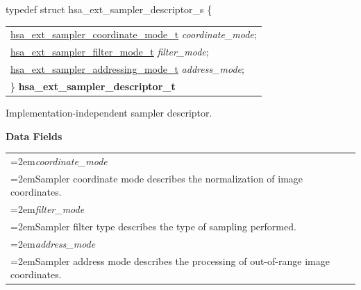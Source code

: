 \documentclass[final]{book}
\newcommand{\reffld}[1]{\textit{#1}}
\begin{document}
\noindent\begin{tcolorbox}[breakable,nobeforeafter,arc=0mm,colframe=white,colback=lightgray,left=0mm]
typedef struct  hsa_ext_sampler_descriptor_s \{
\vspace{-3.5mm}\begin{longtable}{@{}p{\textwidth}}
\hspace{1.7em}\hyperlink{group__images_1gad7644f3eccb4f8ce5693313b88440d87}{hsa_ext_sampler_coordinate_mode_t} \reffld{coordinate_mode};\\
\hspace{1.7em}\hyperlink{group__images_1ga0f0c16fdeea5c2a56130ecefe7cefd02}{hsa_ext_sampler_filter_mode_t} \reffld{filter_mode};\\
\hspace{1.7em}\hyperlink{group__images_1ga60a9fcdc1a1f338bd7e54445359fdf0f}{hsa_ext_sampler_addressing_mode_t} \reffld{address_mode};\\
\}  \hypertarget{group__images_1ga4d5e53a9c2225305ab307cdbfa3cbbd2}{\textbf{hsa_ext_sampler_descriptor_t}}
\end{longtable}

\end{tcolorbox}
Implementation-independent sampler descriptor.

\noindent\textbf{Data Fields}\\[-6mm]
\begin{longtable}{@{}>{\hangindent=2em}p{\textwidth}}
\reffld{coordinate_mode}\\\hspace{2em}Sampler coordinate mode describes the normalization of image coordinates.\\[2mm]
\reffld{filter_mode}\\\hspace{2em}Sampler filter type describes the type of sampling performed.\\[2mm]
\reffld{address_mode}\\\hspace{2em}Sampler address mode describes the processing of out-of-range image coordinates.
\end{longtable}
\end{document}
